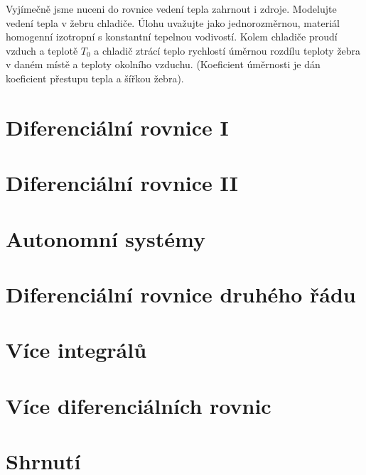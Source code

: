 Vyjímečně jsme nuceni do rovnice vedení tepla zahrnout i zdroje. 
Modelujte vedení tepla v žebru chladiče. Úlohu uvažujte jako
jednorozměrnou, materiál homogenní izotropní s konstantní tepelnou
vodivostí. Kolem chladiče proudí vzduch a teplotě $T_0$ a chladič
ztrácí teplo rychlostí úměrnou rozdílu teploty žebra v daném místě a
teploty okolního vzduchu. (Koeficient úměrnosti je dán koeficient přestupu tepla a šířkou žebra).


\section{Diferenciální rovnice I}

\section{Diferenciální rovnice II}

\section{Autonomní systémy}

\section{Diferenciální rovnice druhého řádu}

\section{Více integrálů}

\section{Více diferenciálních rovnic}

\section{Shrnutí}






